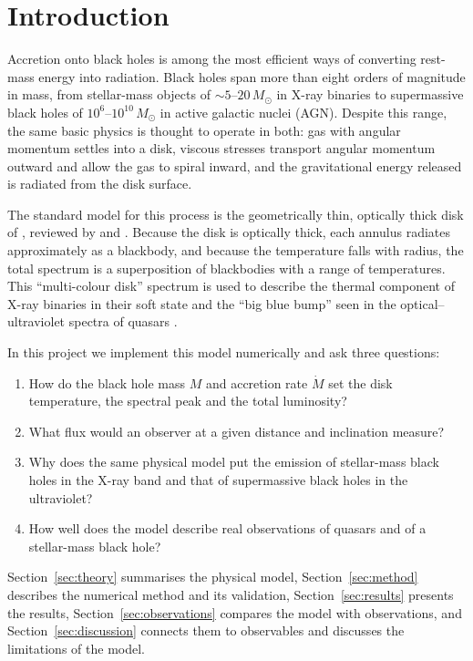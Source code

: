 \documentclass[11pt,a4paper]{article}
\newcommand{\Msun}{M_\odot}
\newcommand{\Mdot}{\dot M}
\begin{document}
\section{Introduction}

Accretion onto black holes is among the most efficient ways of converting
rest-mass energy into radiation. Black holes span more than eight orders of
magnitude in mass, from stellar-mass objects of
$\sim5$--$20\,\Msun$ in X-ray binaries to supermassive black holes of
$10^6$--$10^{10}\,\Msun$ in active galactic nuclei (AGN). Despite this range,
the same basic physics is thought to operate in both: gas with angular
momentum settles into a disk, viscous stresses transport angular momentum
outward and allow the gas to spiral inward, and the gravitational energy
released is radiated from the disk surface.

The standard model for this process is the geometrically thin, optically
thick disk of \citet{ShakuraSunyaev1973}, reviewed by \citet{Pringle1981} and
\citet{FrankKingRaine2002}. Because the disk is optically thick, each annulus
radiates approximately as a blackbody, and because the temperature falls with
radius, the total spectrum is a superposition of blackbodies with a range of
temperatures. This ``multi-colour disk'' spectrum is used to describe the
thermal component of X-ray binaries in their soft state
\citep{Mitsuda1984,RemillardMcClintock2006} and the ``big blue bump'' seen in
the optical--ultraviolet spectra of quasars \citep{Shields1978,Malkan1983}.

In this project we implement this model numerically and ask three
questions:
\begin{enumerate}
  \item How do the black hole mass $M$ and accretion rate $\Mdot$ set the
        disk temperature, the spectral peak and the total luminosity?
  \item What flux would an observer at a given distance and inclination
        measure?
  \item Why does the same physical model put the emission of stellar-mass
        black holes in the X-ray band and that of supermassive black holes
        in the ultraviolet?
  \item How well does the model describe real observations of quasars and
        of a stellar-mass black hole?
\end{enumerate}
Section~\ref{sec:theory} summarises the physical model,
Section~\ref{sec:method} describes the numerical method and its validation,
Section~\ref{sec:results} presents the results,
Section~\ref{sec:observations} compares the model with observations, and
Section~\ref{sec:discussion} connects them to observables and discusses the
limitations of the model.
\end{document}
